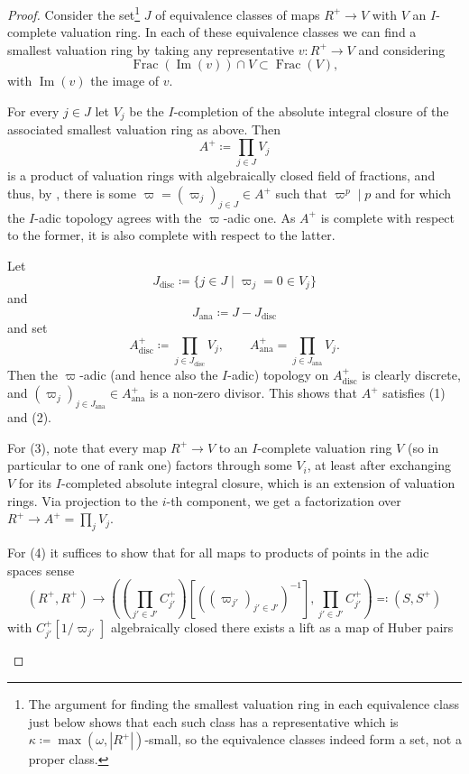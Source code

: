 \documentclass[10pt,twoside]{article}
\numberwithin{equation}{section}
\theoremstyle{plain}
\theoremstyle{definition}
\DeclareMathOperator{\im}{Im}
\DeclareMathOperator{\Frac}{Frac}
\DeclareMathOperator{\ana}{ana}
\DeclareMathOperator{\disc}{disc}
\begin{document}
\begin{proof}
Consider the set\footnote{The argument for finding the smallest valuation ring in each equivalence class just below shows that each such class has a representative which is \(\kappa\coloneqq \max(\omega, |R^+|)\)-small, so the equivalence classes indeed form a set, not a proper class.} \(J\) of equivalence classes of maps \(R^+\to V\) with \(V\) an \(I\)-complete valuation ring. In each of these equivalence classes we can find a smallest valuation ring by taking any representative \(v\colon R^+\to V\) and considering 
\[\Frac(\im(v))\cap V\subset \Frac(V),\]
with \(\im(v)\) the image of \(v\).\par
For every \(j\in J\) let \(V_j\) be the \(I\)-completion of the absolute integral closure of the associated smallest valuation ring as above. Then 
\[A^+\coloneqq \prod_{j\in J} V_j\]
is a product of valuation rings with algebraically closed field of fractions, and thus, by , there is some \(\varpi=(\varpi_j)_{j\in J}\in A^+\) such that \(\varpi^p\mid p\) and for which the \(I\)-adic topology agrees with the \(\varpi\)-adic one. As \(A^+\) is complete with respect to the former, it is also complete with respect to the latter.\par
Let 
\[J_{\disc}\coloneqq \{j\in J\mid \varpi_j=0\in V_j\}\]
and
\[J_{\ana}\coloneqq J - J_{\disc}\]
and set 
\[A^+_{\disc}\coloneqq \prod_{j\in J_{\disc}} V_j,
\qquad A^+_{\ana} = \prod_{j\in J_{\ana}}V_j.\]
Then the \(\varpi\)-adic (and hence also the \(I\)-adic) topology on \(A_{\disc}^+\) is clearly discrete, and \((\varpi_j)_{j\in J_{\ana}} \in A^+_{\ana}\) is a non-zero divisor. This shows that \(A^+\) satisfies (1) and (2). \par
For (3), note that every map \(R^+\to V\) to an \(I\)-complete valuation ring \(V\) (so in particular to one of rank one) factors through some \(V_i\), at least after exchanging \(V\) for its \(I\)-completed absolute integral closure, which is an extension of valuation rings. Via projection to the \(i\)-th component, we get a factorization over \(R^+\to A^+=\prod_j V_j\).\par
For (4) it suffices to show that for all maps to products of points in the adic spaces sense
\[(R^+,R^+)\longrightarrow\left((\prod_{j'\in J'} C_{j'}^+)[((\varpi_{j'})_{{j'}\in J'})^{-1}],\prod_{{j'}\in J'}C_{j'}^+\right)\eqqcolon (S,S^+)\]
with \(C_{j'}^+[1/\varpi_{j'}]\) algebraically closed there exists a lift as a map of Huber pairs

\begin{center}
\end{center}
\end{proof}
\end{document}
